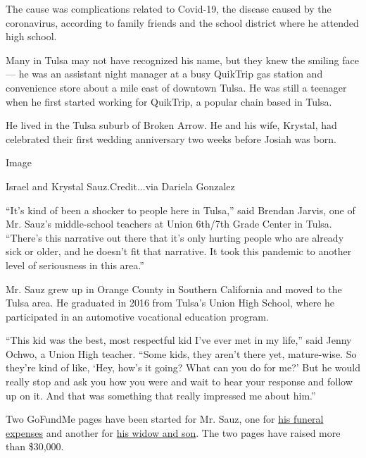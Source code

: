 The cause was complications related to Covid-19, the disease caused by
the coronavirus, according to family friends and the school district
where he attended high school.

Many in Tulsa may not have recognized his name, but they knew the
smiling face --- he was an assistant night manager at a busy QuikTrip
gas station and convenience store about a mile east of downtown Tulsa.
He was still a teenager when he first started working for QuikTrip, a
popular chain based in Tulsa.

He lived in the Tulsa suburb of Broken Arrow. He and his wife, Krystal,
had celebrated their first wedding anniversary two weeks before Josiah
was born.

Image

Israel and Krystal Sauz.Credit...via Dariela Gonzalez

``It's kind of been a shocker to people here in Tulsa,'' said Brendan
Jarvis, one of Mr. Sauz's middle-school teachers at Union 6th/7th Grade
Center in Tulsa. ``There's this narrative out there that it's only
hurting people who are already sick or older, and he doesn't fit that
narrative. It took this pandemic to another level of seriousness in this
area.''

Mr. Sauz grew up in Orange County in Southern California and moved to
the Tulsa area. He graduated in 2016 from Tulsa's Union High School,
where he participated in an automotive vocational education program.

``This kid was the best, most respectful kid I've ever met in my life,''
said Jenny Ochwo, a Union High teacher. ``Some kids, they aren't there
yet, mature-wise. So they're kind of like, `Hey, how's it going? What
can you do for me?' But he would really stop and ask you how you were
and wait to hear your response and follow up on it. And that was
something that really impressed me about him.''

Two GoFundMe pages have been started for Mr. Sauz, one for
\href{https://www.gofundme.com/f/funeral-expenses-for-israel-sauz?utm_source=customer\&utm_medium=sms\&utm_campaign=p_cf+share-flow-1}{his
funeral expenses} and another for
\href{https://www.gofundme.com/f/for-isreal-sauz039s-widow-amp-son?utm_source=facebook\&utm_medium=social\&utm_campaign=p_cp+share-sheet\&fbclid=IwAR1HTFzFEamwsqOxJvQK-x--tgOAh-0XXmTopTKdQ8AZWQsCu4kXpAYA2nQ}{his
widow and son}. The two pages have raised more than \$30,000.

\href{https://www.nytimes3xbfgragh.onion/interactive/2020/obituaries/people-died-coronavirus-obituaries.html?action=click\&pgtype=Article\&state=default\&region=BELOW_MAIN_CONTENT\&context=covid_obits_promo}{}

